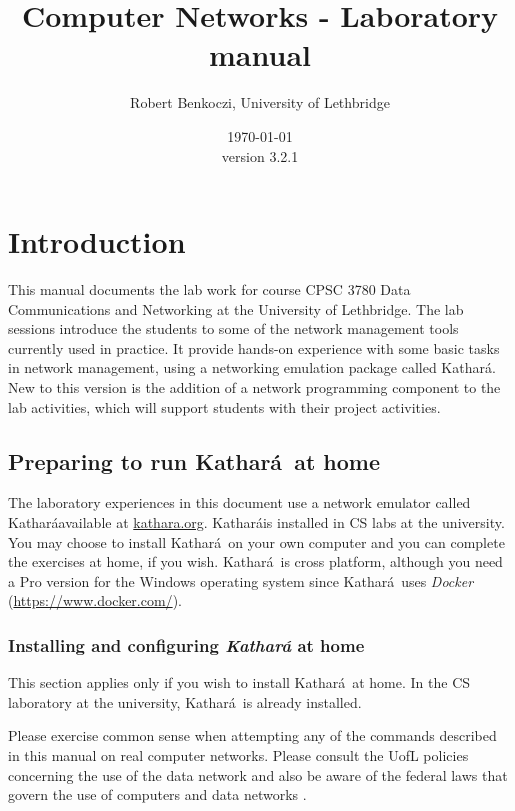 \documentclass[12pt]{book}
\title{Computer Networks - Laboratory manual}    %
\author{Robert Benkoczi, University of Lethbridge}    %
\date{\today\\ version 3.2.1}  %
\newcommand{\kathara}{Kathar\'a}
\begin{document}
\frontmatter                            %
\maketitle    
\doclicenseThis                      
\tableofcontents                        %

\mainmatter %

\chapter{Introduction}

This manual documents the lab work for course CPSC 3780 Data Communications and Networking at the University of Lethbridge. The lab sessions introduce the students to some of the network management tools currently used in practice. It provide hands-on experience with some basic tasks in network management, using a networking emulation package called \kathara. New to this version is the addition of a network programming component to the lab activities, which will support students with their project activities.


\section{Preparing to run \kathara\ at home}\label{intro.se}

The laboratory experiences in this document use a network emulator called \kathara available at \url{kathara.org}. \kathara is installed in CS labs at the university. You may choose to install \kathara\ on your own computer and you can complete the exercises at home, if you wish. \kathara\ is cross platform, although you need a Pro version for the Windows operating system since \kathara\ uses \emph{Docker} (\url{https://www.docker.com/}).

\subsection{Installing and configuring \emph{\kathara} at home}

This section applies only if you wish to install \kathara\ at home. In the CS laboratory at the university, \kathara\ is already installed.

\begin{tcolorbox}[title=Lab safety note]
  Please exercise common sense when attempting any
  of the commands described in this manual on real computer
  networks. Please consult the UofL policies concerning the use of the
  data network \cite{its-policies} and also be aware of the federal
  laws that govern the use of computers and data networks
  \cite{law-canada,law-us}. 
\end{tcolorbox}
\end{document}
